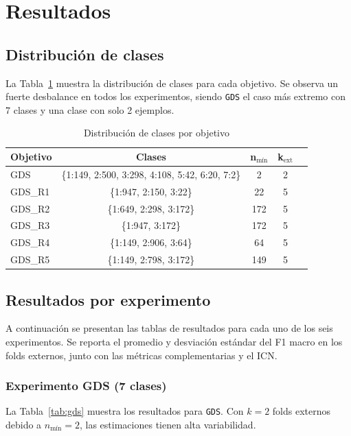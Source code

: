 \documentclass[conference]{IEEEtran}
\begin{document}
\section{Resultados}

\subsection{Distribución de clases}
La Tabla~\ref{tab:distribucion} muestra la distribución de clases para cada objetivo. Se observa un fuerte desbalance en todos los experimentos, siendo \texttt{GDS} el caso más extremo con 7 clases y una clase con solo 2 ejemplos.

\begin{table}[h]
\centering
\caption{Distribución de clases por objetivo}
\label{tab:distribucion}
\begin{tabular}{lcccc}
\toprule
\textbf{Objetivo} & \textbf{Clases} & \textbf{n$_{\text{mín}}$} & \textbf{k$_{\text{ext}}$} \\
\midrule
GDS & \{1:149, 2:500, 3:298, 4:108, 5:42, 6:20, 7:2\} & 2 & 2 \\
GDS\_R1 & \{1:947, 2:150, 3:22\} & 22 & 5 \\
GDS\_R2 & \{1:649, 2:298, 3:172\} & 172 & 5 \\
GDS\_R3 & \{1:947, 3:172\} & 172 & 5 \\
GDS\_R4 & \{1:149, 2:906, 3:64\} & 64 & 5 \\
GDS\_R5 & \{1:149, 2:798, 3:172\} & 149 & 5 \\
\bottomrule
\end{tabular}
\end{table}

\subsection{Resultados por experimento}
A continuación se presentan las tablas de resultados para cada uno de los seis experimentos. Se reporta el promedio y desviación estándar del F1 macro en los folds externos, junto con las métricas complementarias y el ICN.

\subsubsection*{Experimento GDS (7 clases)}
La Tabla~\ref{tab:gds} muestra los resultados para \texttt{GDS}. Con \(k=2\) folds externos debido a \(n_{\text{mín}}=2\), las estimaciones tienen alta variabilidad.
\end{document}
